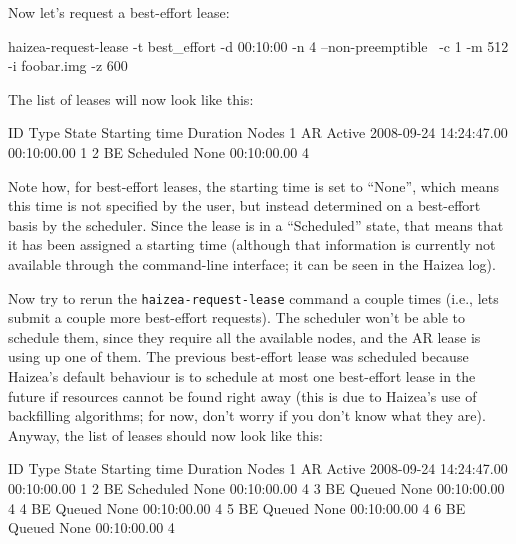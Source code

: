 Now let's request a best-effort lease:

\begin{wideshellverbatim}
haizea-request-lease -t best_effort -d 00:10:00 -n 4 --non-preemptible \
                     -c 1 -m 512 -i foobar.img -z 600
\end{wideshellverbatim}

The list of leases will now look like this:

\begin{wideshellverbatim}
 ID   Type  State      Starting time           Duration      Nodes  
 1    AR    Active     2008-09-24 14:24:47.00  00:10:00.00   1       
 2    BE    Scheduled  None                    00:10:00.00   4       
\end{wideshellverbatim}

Note how, for best-effort leases, the starting time is set to ``None'', which means this time is not specified by the user, but instead determined on a best-effort basis by the scheduler. Since the lease is in a ``Scheduled'' state, that means that it has been assigned a starting time (although that information is currently not available through the command-line interface; it can be seen in the Haizea log).

Now try to rerun the \texttt{haizea-request-lease} command a couple times (i.e., lets submit a couple more best-effort requests). The scheduler won't be able to schedule them, since they require all the available nodes, and the AR lease is using up one of them. The previous best-effort lease was scheduled because Haizea's default behaviour is to schedule at most one best-effort lease in the future if resources cannot be found right away (this is due to Haizea's use of backfilling algorithms; for now, don't worry if you don't know what they are). Anyway, the list of leases should now look like this:

\begin{wideshellverbatim}
 ID   Type  State      Starting time           Duration      Nodes  
 1    AR    Active     2008-09-24 14:24:47.00  00:10:00.00   1       
 2    BE    Scheduled  None                    00:10:00.00   4       
 3    BE    Queued     None                    00:10:00.00   4       
 4    BE    Queued     None                    00:10:00.00   4       
 5    BE    Queued     None                    00:10:00.00   4       
 6    BE    Queued     None                    00:10:00.00   4       
\end{wideshellverbatim}

